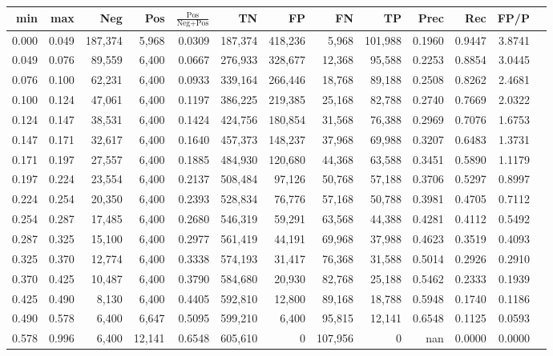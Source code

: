 \begin{tabular}{rrrrrrrrrrrrr}
\toprule
  min &   max &     Neg &    Pos & $\frac{\text{Pos}}{\text{Neg}+\text{Pos}}$ &      TN &      FP &      FN &      TP &   Prec &    Rec &   FP/P \\
\midrule
0.000 & 0.049 & 187,374 &  5,968 &                                     0.0309 & 187,374 & 418,236 &   5,968 & 101,988 & 0.1960 & 0.9447 & 3.8741 \\
0.049 & 0.076 &  89,559 &  6,400 &                                     0.0667 & 276,933 & 328,677 &  12,368 &  95,588 & 0.2253 & 0.8854 & 3.0445 \\
0.076 & 0.100 &  62,231 &  6,400 &                                     0.0933 & 339,164 & 266,446 &  18,768 &  89,188 & 0.2508 & 0.8262 & 2.4681 \\
0.100 & 0.124 &  47,061 &  6,400 &                                     0.1197 & 386,225 & 219,385 &  25,168 &  82,788 & 0.2740 & 0.7669 & 2.0322 \\
0.124 & 0.147 &  38,531 &  6,400 &                                     0.1424 & 424,756 & 180,854 &  31,568 &  76,388 & 0.2969 & 0.7076 & 1.6753 \\
0.147 & 0.171 &  32,617 &  6,400 &                                     0.1640 & 457,373 & 148,237 &  37,968 &  69,988 & 0.3207 & 0.6483 & 1.3731 \\
0.171 & 0.197 &  27,557 &  6,400 &                                     0.1885 & 484,930 & 120,680 &  44,368 &  63,588 & 0.3451 & 0.5890 & 1.1179 \\
0.197 & 0.224 &  23,554 &  6,400 &                                     0.2137 & 508,484 &  97,126 &  50,768 &  57,188 & 0.3706 & 0.5297 & 0.8997 \\
0.224 & 0.254 &  20,350 &  6,400 &                                     0.2393 & 528,834 &  76,776 &  57,168 &  50,788 & 0.3981 & 0.4705 & 0.7112 \\
0.254 & 0.287 &  17,485 &  6,400 &                                     0.2680 & 546,319 &  59,291 &  63,568 &  44,388 & 0.4281 & 0.4112 & 0.5492 \\
0.287 & 0.325 &  15,100 &  6,400 &                                     0.2977 & 561,419 &  44,191 &  69,968 &  37,988 & 0.4623 & 0.3519 & 0.4093 \\
0.325 & 0.370 &  12,774 &  6,400 &                                     0.3338 & 574,193 &  31,417 &  76,368 &  31,588 & 0.5014 & 0.2926 & 0.2910 \\
0.370 & 0.425 &  10,487 &  6,400 &                                     0.3790 & 584,680 &  20,930 &  82,768 &  25,188 & 0.5462 & 0.2333 & 0.1939 \\
0.425 & 0.490 &   8,130 &  6,400 &                                     0.4405 & 592,810 &  12,800 &  89,168 &  18,788 & 0.5948 & 0.1740 & 0.1186 \\
0.490 & 0.578 &   6,400 &  6,647 &                                     0.5095 & 599,210 &   6,400 &  95,815 &  12,141 & 0.6548 & 0.1125 & 0.0593 \\
0.578 & 0.996 &   6,400 & 12,141 &                                     0.6548 & 605,610 &       0 & 107,956 &       0 &    nan & 0.0000 & 0.0000 \\
\bottomrule
\end{tabular}
